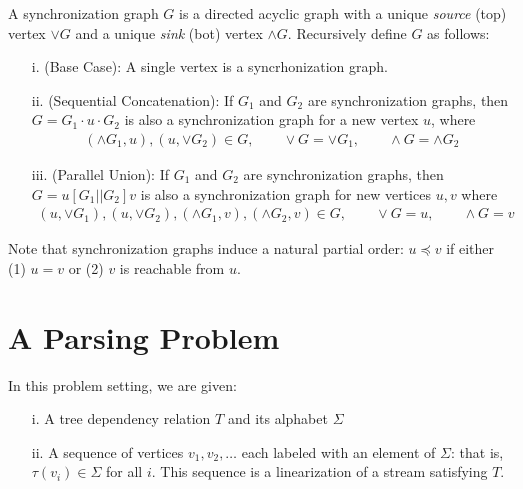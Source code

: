 \documentclass[12pt]{article}
\begin{document}
\begin{definition}
  A synchronization graph \(G\) is a directed acyclic graph
  with a unique \textit{source} (top) vertex \(\vee G\)
  and a unique \textit{sink} (bot) vertex \(\wedge G\).
  Recursively define \(G\) as follows:
  \begin{enumerate}
    \item[i.] (Base Case):
      A single vertex is a syncrhonization graph.

    \item[ii.] (Sequential Concatenation):
      If \(G_1\) and \(G_2\) are synchronization graphs,
      then \(G = G_1 \cdot u \cdot G_2\) is also a synchronization graph
      for a new vertex \(u\), where
      \begin{align*}
        (\wedge G_1, u), (u, \vee G_2) \in G,
        \qquad \vee G = \vee G_1,
        \qquad \wedge G = \wedge G_2
      \end{align*}


    \item[iii.] (Parallel Union):
      If \(G_1\) and \(G_2\) are synchronization graphs,
      then \(G = u [ G_1 || G_2 ] v\) is also a synchronization graph
      for new vertices \(u, v\) where
      \begin{align*}
        (u, \vee G_1), (u, \vee G_2),
        (\wedge G_1, v), (\wedge G_2, v) \in G,
          \qquad \vee G = u,
          \qquad \wedge G = v
      \end{align*}

  \end{enumerate}
\end{definition}

Note that synchronization graphs induce a natural partial order:
\(u \preceq v\) if either (1) \(u = v\) or (2) \(v\) is reachable from \(u\).


\section{A Parsing Problem}
In this problem setting, we are given:
\begin{enumerate}
  \item[i.] A tree dependency relation \(T\) and its alphabet \(\Sigma\)

  \item[ii.]
    A sequence of vertices \(v_1, v_2, \ldots\)
    each labeled with an element of \(\Sigma\):
    that is, \(\tau(v_i) \in \Sigma\) for all \(i\).
    This sequence is a linearization of a stream satisfying \(T\).

\end{enumerate}
\end{document}
